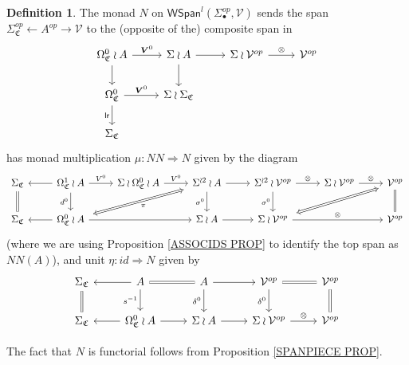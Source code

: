 \documentclass[a4paper,10pt
,draft
]{article}%
\numberwithin{equation}{section}
\numberwithin{figure}{section}
\theoremstyle{definition} %
\newtheorem{definition}[equation]{Definition}%
\newcommand{\1}{\ensuremath{\mathbbm 1}}%
\begin{document}
\begin{definition}\label{NCOLOR DEF}
The monad $N$ on 
$\mathsf{WSpan}^l(\Sigma_{\bullet}^{op},\mathcal{V})$
sends the span 
$\Sigma^{op}_{\mathfrak{C}} \leftarrow A^{op} \to \mathcal{V}$
to the (opposite of the) composite span in
\begin{equation}\label{NCOLOR EQ}
\begin{tikzcd}
	\Omega^0_{\mathfrak{C}} \wr A \ar{r}{\boldsymbol{V}^0} \ar{d} &
	\Sigma \wr A  \ar{d} \ar{r} &
	\Sigma \wr \mathcal{V}^{op} \ar{r}{\otimes} &
	\mathcal{V}^{op}
\\
	\Omega^0_{\mathfrak{C}} \ar{r}{\boldsymbol{V}^0} \arrow[d, "\mathsf{lr}"'] &
	\Sigma \wr \Sigma_{\mathfrak{C}} 
\\
	\Sigma_{\mathfrak{C}}
\end{tikzcd}
\end{equation}
has monad multiplication
$\mu \colon N N
\Rightarrow 
N$ given by the diagram
\begin{equation}\label{NMONMULTTR EQ}
\begin{tikzcd}
	\Sigma_{\mathfrak{C}} \ar[equal]{d}&
	\Omega^1_{\mathfrak{C}} \wr A \ar{l} \arrow[r, "V^0"] \ar{d}[swap]{d^0}&
	\Sigma \wr \Omega^0_{\mathfrak{C}} \wr A \arrow[r, "V^0"] &
	|[alias=U]|
	\Sigma^{\wr 2} \wr A \ar{r} \ar{d}[swap]{\sigma^0} &
	\Sigma^{\wr 2} \wr \mathcal{V}^{op} \ar{r}{\otimes} \ar{d}[swap]{\sigma^0} &
	\Sigma \wr \mathcal{V}^{op} \ar{r}{\otimes} &
	|[alias=UU]|
	\mathcal{V}^{op} \ar[equal]{d}
\\
	\Sigma_{\mathfrak{C}} &
	|[alias=V]|
	\Omega^0_{\mathfrak{C}} \wr A \ar{l} \ar{rr} & &
	\Sigma \wr A \ar{r} &
	|[alias=VV]|
	\Sigma \wr \mathcal{V}^{op} \ar{rr}{\otimes} & &
	\mathcal{V}^{op}
\arrow[Leftrightarrow, from=V, to=U,shorten >=0.15cm,shorten <=0.15cm
,swap,"\pi"
]
\arrow[Leftrightarrow, from=VV, to=UU,shorten >=0.15cm,shorten <=0.15cm
]
\end{tikzcd}
\end{equation}
(where we are using Proposition \ref{ASSOCIDS PROP} to identify the top span as $NN(A)$),
and unit
$\eta \colon id \Rightarrow N$ given by
\begin{equation}\label{NMONIDTR EQ}
\begin{tikzcd}
	\Sigma_{\mathfrak{C}} \ar[equal]{d} & 
	A \ar{d}[swap]{s^{-1}} \ar{l} \ar[equal]{r} &
	A \ar{d}[swap]{\delta^0} \ar{r} &
	\mathcal{V}^{op} \ar{d}[swap]{\delta^0} \ar[equal]{r} &
	\mathcal{V}^{op} \ar[equal]{d}
\\
	\Sigma_{\mathfrak{C}} &
	\Omega^0_{\mathfrak{C}} \wr A \ar{l} \ar{r} &
	\Sigma \wr A \ar{r} &
	\Sigma \wr \mathcal{V}^{op} \ar{r}{\otimes} &
	\mathcal{V}^{op}
\end{tikzcd}
\end{equation}

The fact that $N$ is functorial follows from Proposition \ref{SPANPIECE PROP}.
\end{definition}
\end{document}

